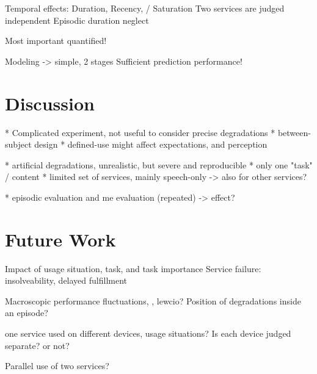 Temporal effects: Duration, Recency, / Saturation
Two services are judged independent
Episodic duration neglect

Most important quantified!

Modeling -> simple, 2 stages
Sufficient prediction performance!

\section{Discussion}
* Complicated experiment, not useful to consider precise degradations
* between-subject design
* defined-use might affect expectations, and perception

* artificial degradations, unrealistic, but severe and reproducible
* only one "task" / content
* limited set of services, mainly speech-only -> also for other services?
	
* episodic evaluation and me evaluation (repeated) -> effect?

\section{Future Work}
Impact of usage situation, task, and task importance
Service failure: insolveability, delayed fulfillment

Macroscopic performance fluctuations, \ie, lewcio?
Position of degradations inside an episode?

one service used on different devices, usage situations?
Is each device judged separate? or not?

Parallel use of two services?